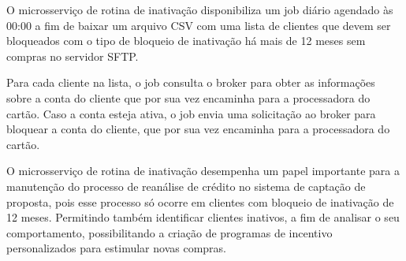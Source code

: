 O microsserviço de rotina de inativação disponibiliza um job diário agendado às 
00:00 a fim de baixar um arquivo CSV com uma lista de clientes que devem ser 
bloqueados com o tipo de bloqueio de inativação há mais de 12 meses sem compras no 
servidor SFTP. 

Para cada cliente na lista, o job consulta o broker para obter as informações sobre 
a conta do cliente que por sua vez encaminha para a processadora do cartão. Caso a 
conta esteja ativa, o job envia uma solicitação ao broker para bloquear a conta do cliente, 
que por sua vez encaminha para a processadora do cartão.

O microsserviço de rotina de inativação desempenha um papel importante para a 
manutenção  do processo de reanálise de crédito no sistema de captação de proposta, 
pois esse processo só ocorre em clientes com bloqueio de inativação de 12 meses. 
Permitindo também identificar clientes inativos, a fim de analisar o seu comportamento,
possibilitando a criação de programas de incentivo personalizados para estimular 
novas compras.

